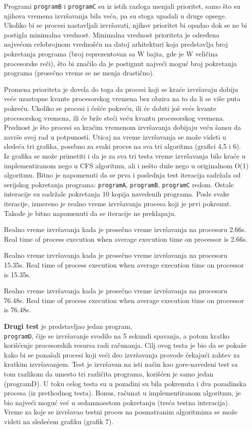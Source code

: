 Programi \texttt{programB} i \texttt{programC} su iz istih razloga menjali prioritet, samo što su njihova
vremena izvršavanja bila veća, pa su stoga upadali u druge opsege. Ukoliko bi se procesi
nastavljali izvršavati, njihov prioritet bi opadao dok se ne bi postigla minimalna vrednost.
Minimalna vrednost prioriteta je određena najvećom celobrojnom vrednošću na datoj
arhitekturi koja predstavlja broj pokretanja programa (broj reprezentovan sa W bajta, gde je
W veličina procesorske reči), što bi značilo da je postignut najveći moguć broj pokretanja
programa (prosečno vreme se ne menja drastično).

Promena prioriteta je dovela do toga da procesi koji se kraće izvršavaju dobiju veće
uzastopne kvante procesorskog vremena bez obzira na to da li se više puta pokreću. Ukoliko
se procesi i češće pokreću, ili će dobiti još veće kvante procesorskog vremena, ili će brže
steći veću kvantu procesorskog vremena. Prednost je što procesi sa kraćim vremenom
izvršavanja dobijaju veću šansu da završe svoj rad u potpunosti. Uticaj na vreme izvršavanja
se može videti u sledeća tri grafika, posebno za svaki proces na sva tri algoritma (grafici 4,5 i
6). Iz grafika se može primetiti i da je za sva tri testa vreme izvršavanja bilo kraće u
implementiranom nego u CFS algoritmu, ali i nešto duže nego u originalnom O(1) algoritmu.
Bitno je napomenuti da se prva i poslednja test iteracija sadržala od serijskog pokretanja
programa: \texttt{programA}, \texttt{programB}, \texttt{programC} redom. Ostale interacije su sadržale
pokretanja 10 kopija navedenih programa. Posle svake iteracije, izmereno je realno vreme
izvršavanja procesa koji je prvi pokrenut. Takođe je bitno napomenuti da se iteracije ne
preklapaju.

    {Realno vreme izvršavanja kada je prosečno vreme izvršavanja na procesoru 2.66s.}
    {Real time of process execution when average execution time on processor is 2.66s.}

    {Realno vreme izvršavanja kada je prosečno vreme izvršavanja na procesoru 15.35s.}
    {Real time of process execution when average execution time on processor is 15.35s.}

    {Realno vreme izvršavanja kada je prosečno vreme izvršavanja na procesoru 76.48s.}
    {Real time of process execution when average execution time on processor is 76.48s.}

\textbf{Drugi test} je predstavljao jedan program,\\ \texttt{programD}, čije se izvršavanje svodilo na 5
sekundi spavanja, a potom kratko korišćenje procesorskih resursa radi računanja. Cilj ovog
testa je bio da se pokaže kako bi se ponašali procesi koji veći deo izvršavanja provode
čekajući zahtev za kratkim izvršavanjem. Test je izvršavan na isti način kao gore-navedeni
test sa tom razlikom da umesto tri različita programa, korišćen je samo jedan (programD).
U toku celog testa su u pozadini su bila pokrenuta i dva pozadinska procesa (iz prethodnog
testa). Bonus, računat u implementiranom algoritmu, je bio najveći moguć već u
sedamnaestom pokretanju (treća testna interacija). Vreme za koje se izvršavao testni proces
na posmatranim algoritmima se može videti na sledećem grafiku (grafik 7).

